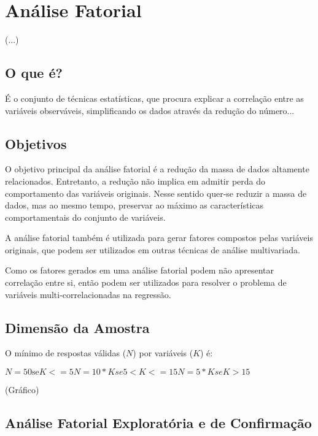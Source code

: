 \section{Análise Fatorial \cite{torres}}

    (...)

	\subsection{O que é?}

        É o conjunto de técnicas estatísticas, que procura explicar a correlação entre as variáveis observáveis, simplificando os dados através da redução do número...
        
    \subsection{Objetivos}
    
        O objetivo principal da análise fatorial é a redução da massa de dados altamente relacionados. Entretanto, a redução não implica em admitir perda do comportamento das variáveis originais. Nesse sentido quer-se reduzir a massa de dados, mas ao mesmo tempo, preservar ao máximo as características comportamentais do conjunto de variáveis.
        
        A análise fatorial também é utilizada para gerar fatores compostos pelas variáveis originais, que podem ser utilizados em outras técnicas de análise multivariada.
        
        Como os fatores gerados em uma análise fatorial podem não apresentar correlação entre si, então podem ser utilizados para resolver o problema de variáveis multi-correlacionadas na regressão.
        
    \subsection{Dimensão da Amostra}
    
        O mínimo de respostas válidas ($N$) por variáveis ($K$) é:
        
        $
        N = 50 \text{se} K <= 5
        N = 10 * K se 5 < K <= 15
        N = 5 * K se K > 15
        $
        
        (Gráfico)
        
    \subsection{Análise Fatorial Exploratória e de Confirmação}
    
